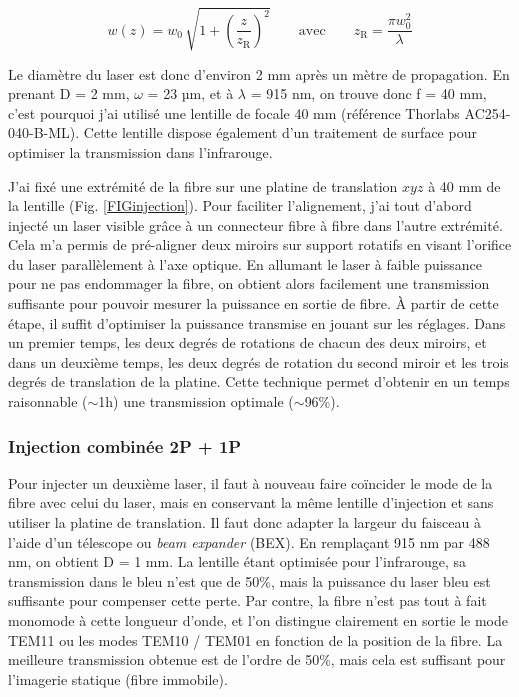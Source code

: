 $$
w(z) = w_0 \, \sqrt{ 1+ {\left( \frac{z}{z_\mathrm{R}} \right)}^2 } \qquad \text{avec} \qquad
z_\mathrm{R} = \frac{\pi w_0^2 }{\lambda}
$$

Le diamètre du laser est donc d'environ 2 mm après un mètre de propagation. En prenant D = 2 mm, $\omega$ = 23 µm, et à $\lambda$ = 915 nm, on trouve donc f = 40 mm, c'est pourquoi j'ai utilisé une lentille de focale 40 mm (référence Thorlabs AC254-040-B-ML). Cette lentille dispose également d'un traitement de surface pour optimiser la transmission dans l'infrarouge.


J'ai fixé une extrémité de la fibre sur une platine de translation $xyz$ à 40 mm de la lentille (Fig. \ref{FIGinjection}). Pour faciliter l'alignement, j'ai tout d'abord injecté un laser visible grâce à un connecteur fibre à fibre dans l'autre extrémité. Cela m'a permis de pré-aligner deux miroirs sur support rotatifs en visant l'orifice du laser parallèlement à l'axe optique. En allumant le laser à faible puissance pour ne pas endommager la fibre, on obtient alors facilement une transmission suffisante pour pouvoir mesurer la puissance en sortie de fibre. À partir de cette étape, il suffit d'optimiser la puissance transmise en jouant sur les réglages. Dans un premier temps, les deux degrés de rotations de chacun des deux miroirs, et dans un deuxième temps, les deux degrés de rotation du second miroir et les trois degrés de translation de la platine. Cette technique permet d'obtenir en un temps raisonnable ($\sim$1h) une transmission optimale ($\sim$96\%).

\subsubsection{Injection combinée 2P + 1P}

Pour injecter un deuxième laser, il faut à nouveau faire coïncider le mode de la fibre avec celui du laser, mais en conservant la même lentille d'injection et sans utiliser la platine de translation. Il faut donc adapter la largeur du faisceau à l'aide d'un télescope ou \emph{beam expander} (BEX). En remplaçant 915 nm par 488 nm, on obtient D = 1 mm. La lentille étant optimisée pour l'infrarouge, sa transmission dans le bleu n'est que de 50\%, mais la puissance du laser bleu est suffisante pour compenser cette perte. Par contre, la fibre n'est pas tout à fait monomode à cette longueur d'onde, et l'on distingue clairement en sortie le mode TEM11 ou les modes TEM10 / TEM01 en fonction de la position de la fibre. La meilleure transmission obtenue est de l'ordre de 50\%, mais cela est suffisant pour l'imagerie statique (fibre immobile).



